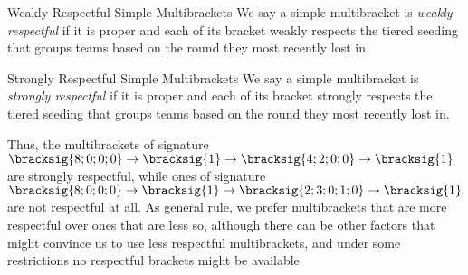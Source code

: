 {    \begin{definition}{Weakly Respectful Simple Multibrackets}{}
        We say a simple multibracket is \textit{weakly respectful} if it is proper and each of its bracket weakly respects the tiered seeding that groups teams based on the round they most recently lost in.
    \end{definition}

    \begin{definition}{Strongly Respectful Simple Multibrackets}{}
        We say a simple multibracket is \textit{strongly respectful} if it is proper and each of its bracket strongly respects the tiered seeding that groups teams based on the round they most recently lost in.
    \end{definition}

    Thus, the multibrackets of signature $\bracksig{8;0;0;0} \to \bracksig{1} \to \bracksig{4; 2; 0; 0} \to \bracksig{1}$ are strongly respectful, while ones of signature $\bracksig{8;0;0;0} \to \bracksig{1} \to \bracksig{2; 3; 0; 1; 0} \to \bracksig{1}$ are not respectful at all. As general rule, we prefer multibrackets that are more respectful over ones that are less so, although there can be other factors that might convince us to use less respectful multibrackets, and under some restrictions no respectful brackets might be available
}